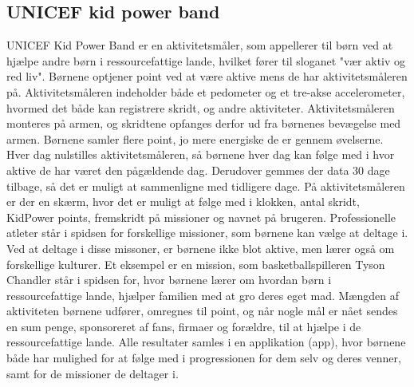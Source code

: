 
\subsection{UNICEF kid power band}
UNICEF Kid Power Band er en aktivitetsmåler, som appellerer til børn ved at hjælpe andre børn i ressourcefattige lande, hvilket fører til sloganet "vær aktiv og red liv". Børnene optjener point ved at være  aktive mens de har aktivitetsmåleren på. Aktivitetsmåleren indeholder både et pedometer og et tre-akse accelerometer, hvormed det både kan registrere skridt, og andre aktiviteter. Aktivitetsmåleren monteres på armen, og skridtene opfanges derfor ud fra børnenes bevægelse med armen. Børnene samler flere point, jo mere energiske de er gennem øvelserne. Hver dag nulstilles aktivitetsmåleren, så børnene hver dag kan følge med i hvor aktive de har været den pågældende dag. Derudover gemmes der data 30 dage tilbage, så det er muligt at sammenligne med tidligere dage. På aktivitetsmåleren er der en skærm, hvor det er muligt at følge med i klokken, antal skridt, KidPower points, fremskridt på missioner og navnet på brugeren.\citep{PowerAbout2015,PowerManual2015} \newline 
Professionelle atleter står i spidsen for forskellige missioner, som børnene kan vælge at deltage i. Ved at deltage i disse missoner, er børnene ikke blot aktive, men lærer også om forskellige kulturer. Et eksempel er en mission, som basketballspilleren Tyson Chandler står i spidsen for, hvor børnene lærer om hvordan børn i ressourcefattige lande, hjælper familien med at gro deres eget mad.\citep{PowerMission2015} \newline
Mængden af aktiviteten børnene udfører, omregnes til point, og når nogle mål er nået sendes en sum penge, sponsoreret af fans, firmaer og forældre, til at hjælpe i de ressourcefattige lande. \newline
Alle resultater samles i en applikation (app), hvor børnene både har mulighed for at følge med i progressionen for dem selv og deres venner, samt for de missioner de deltager i.\citep{PowerAbout2015}


